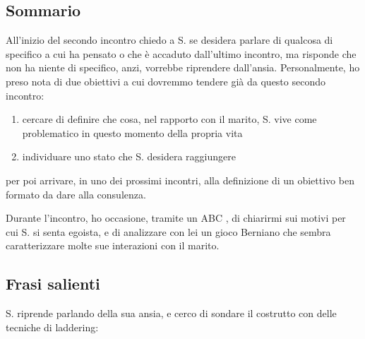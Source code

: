 \subsection*{Sommario}

All'inizio del secondo incontro chiedo a S. se desidera parlare di qualcosa di specifico a cui ha pensato o che è accaduto dall'ultimo incontro, ma risponde che non ha niente di specifico, anzi, vorrebbe riprendere dall'ansia. Personalmente, ho preso nota di due obiettivi a cui dovremmo tendere già da questo secondo incontro:
\begin{enumerate}
\item cercare di definire che cosa, nel rapporto con il marito, S. vive come problematico in questo momento della propria vita
\item individuare uno stato che S. desidera raggiungere
\end{enumerate} 

\noindent per poi arrivare, in uno dei prossimi incontri, alla definizione di un obiettivo ben formato da dare alla consulenza.

Durante l'incontro, ho occasione, tramite un ABC  , di chiarirmi sui motivi per cui S. si senta egoista, e di analizzare con lei un gioco Berniano che sembra caratterizzare molte sue interazioni con il marito.


\subsection*{Frasi salienti}

\noindent S. riprende parlando della sua ansia, e cerco di sondare il costrutto con delle tecniche di laddering:

